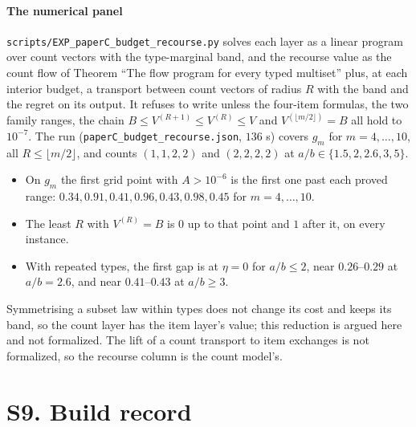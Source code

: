 \paragraph{The numerical panel} \NUM{} \texttt{scripts/EXP\_paperC\_budget\_recourse.py} solves each
layer as a linear program over count vectors with the type-marginal band, and the recourse value
as the count flow of Theorem ``The flow program for every typed multiset'' plus, at each interior
budget, a transport between count vectors of radius $R$ with the band and the regret on its
output. It refuses to write unless the four-item formulas, the two family ranges, the chain
$B\le V^{(R+1)}\le V^{(R)}\le V$ and $V^{(\lfloor m/2\rfloor)}=B$ all hold to $10^{-7}$. The run
(\texttt{paperC\_budget\_recourse.json}, $136$ s) covers $g_m$ for $m=4,\dots,10$, all
$R\le\lfloor m/2\rfloor$, and counts $(1,1,2,2)$ and $(2,2,2,2)$ at $a/b\in\{1.5,2,2.6,3,5\}$.
\begin{itemize}
\item On $g_m$ the first grid point with $A>10^{-6}$ is the first one past each proved range:
$0.34,0.91,0.41,0.96,0.43,0.98,0.45$ for $m=4,\dots,10$.
\item The least $R$ with $V^{(R)}=B$ is $0$ up to that point and $1$ after it, on every
instance.
\item With repeated types, the first gap is at $\eta=0$ for $a/b\le2$, near $0.26$--$0.29$ at
$a/b=2.6$, and near $0.41$--$0.43$ at $a/b\ge3$.
\end{itemize}
Symmetrising a subset law within types does not change its cost and keeps its band, so the
count layer has the item layer's value; this reduction is argued here and not formalized. The lift of a count transport to item exchanges is not
formalized, so the recourse column is the count model's.

\section{S9. Build record}

